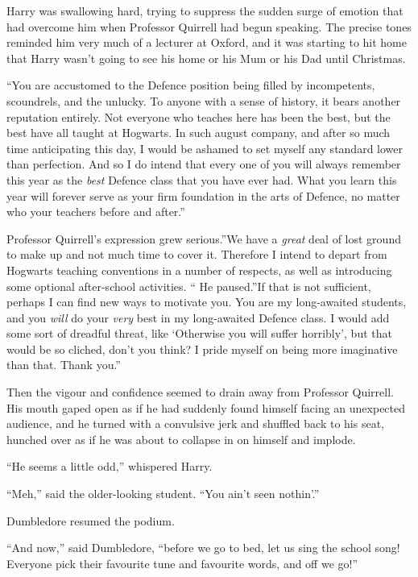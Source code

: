 Harry was swallowing hard, trying to suppress the sudden surge of
emotion that had overcome him when Professor Quirrell had begun
speaking. The precise tones reminded him very much of a lecturer at
Oxford, and it was starting to hit home that Harry wasn't going to see
his home or his Mum or his Dad until Christmas.

``You are accustomed to the Defence position being filled by
incompetents, scoundrels, and the unlucky. To anyone with a sense of
history, it bears another reputation entirely. Not everyone who teaches
here has been the best, but the best have all taught at Hogwarts. In
such august company, and after so much time anticipating this day, I
would be ashamed to set myself any standard lower than perfection. And
so I do intend that every one of you will always remember this year as
the \emph{best} Defence class that you have ever had. What you learn
this year will forever serve as your firm foundation in the arts of
Defence, no matter who your teachers before and after.''

Professor Quirrell's expression grew serious.''We have a \emph{great}
deal of lost ground to make up and not much time to cover it. Therefore
I intend to depart from Hogwarts teaching conventions in a number of
respects, as well as introducing some optional after-school activities.
`` He paused.''If that is not sufficient, perhaps I can find new ways to
motivate you. You are my long-awaited students, and you \emph{will} do
your \emph{very} best in my long-awaited Defence class. I would add some
sort of dreadful threat, like `Otherwise you will suffer horribly', but
that would be so cliched, don't you think? I pride myself on being more
imaginative than that. Thank you.''

Then the vigour and confidence seemed to drain away from Professor
Quirrell. His mouth gaped open as if he had suddenly found himself
facing an unexpected audience, and he turned with a convulsive jerk and
shuffled back to his seat, hunched over as if he was about to collapse
in on himself and implode.

``He seems a little odd,'' whispered Harry.

``Meh,'' said the older-looking student. ``You ain't seen nothin'.''

Dumbledore resumed the podium.

``And now,'' said Dumbledore, ``before we go to bed, let us sing the
school song! Everyone pick their favourite tune and favourite words, and
off we go!''
